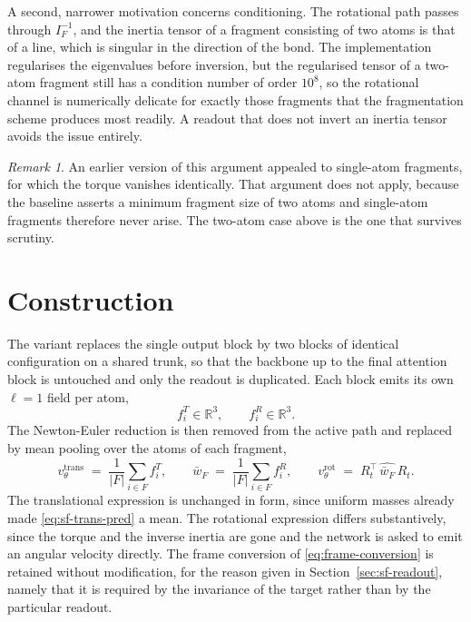 \documentclass[11pt,a4paper]{report}
\theoremstyle{plain}
\theoremstyle{definition}
\theoremstyle{remark}
\newtheorem{remark}[theorem]{Remark}
\newcommand{\R}{\mathbb{R}}
\newcommand{\pred}{v_\theta}
\newcommand{\skewm}[1]{\widehat{#1}}
\newcommand{\Rot}{R}
\begin{document}
A second, narrower motivation concerns conditioning. The rotational path passes
through $I_F^{-1}$, and the inertia tensor of a fragment consisting of two
atoms is that of a line, which is singular in the direction of the bond. The
implementation regularises the eigenvalues before inversion, but the
regularised tensor of a two-atom fragment still has a condition number of order
$10^{8}$, so the rotational channel is numerically delicate for exactly those
fragments that the fragmentation scheme produces most readily. A readout that
does not invert an inertia tensor avoids the issue entirely.

\begin{remark}
An earlier version of this argument appealed to single-atom fragments, for
which the torque vanishes identically. That argument does not apply, because
the baseline asserts a minimum fragment size of two atoms and single-atom
fragments therefore never arise. The two-atom case above is the one that
survives scrutiny.
\end{remark}

\section{Construction}

The variant replaces the single output block by two blocks of identical
configuration on a shared trunk, so that the backbone up to the final
attention block is untouched and only the readout is duplicated. Each block
emits its own $\ell=1$ field per atom,
\begin{equation}
  f_i^{T} \in \R^3, \qquad f_i^{R} \in \R^3 .
\end{equation}
The Newton-Euler reduction is then removed from the active path and replaced by
mean pooling over the atoms of each fragment,
\begin{equation}
  \pred^{\mathrm{trans}} \;=\; \frac{1}{|F|}\sum_{i\in F} f_i^{T},
  \qquad
  \bar{w}_F \;=\; \frac{1}{|F|}\sum_{i\in F} f_i^{R},
  \qquad
  \pred^{\mathrm{rot}} \;=\; \Rot_t^{\top}\,\skewm{\bar{w}_F}\,\Rot_t .
  \label{eq:separate-readout}
\end{equation}
The translational expression is unchanged in form, since uniform masses already
made \eqref{eq:sf-trans-pred} a mean. The rotational expression differs
substantively, since the torque and the inverse inertia are gone and the
network is asked to emit an angular velocity directly. The frame conversion of
\eqref{eq:frame-conversion} is retained without modification, for the reason
given in Section~\ref{sec:sf-readout}, namely that it is required by the
invariance of the target rather than by the particular readout.
\end{document}
